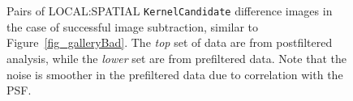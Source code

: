 \documentclass[prd, nofootinbib, floatfix, 11pt,tightenlines,times]{article}
\begin{document}
\begin{figure}
\begin{center}
 \\
 \\
\end{center}
\caption{Pairs of LOCAL:SPATIAL {\tt KernelCandidate} difference images in the case of
  successful image subtraction, similar to
  Figure~\ref{fig_galleryBad}.  The {\it top} set of data are from
  postfiltered analysis, while the {\it lower} set are from
  prefiltered data.  Note that the noise is smoother in the
  prefiltered data due to correlation with the PSF. }
\label{fig_galleryGood}
\end{figure}
\end{document}
